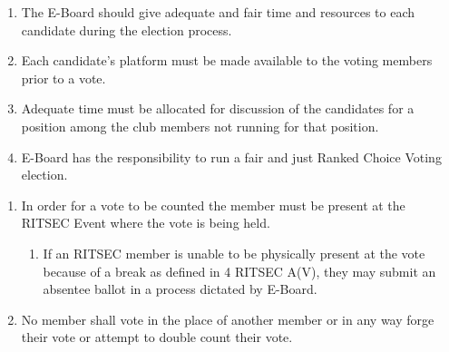 


\begin{enumerate}
  \item The E-Board should give adequate and fair time and resources to each
    candidate during the election process.
  \item Each candidate's platform must be made available to the voting members
    prior to a vote.
  \item Adequate time must be allocated for discussion of the candidates for a
    position among the club members not running for that position.
  \item E-Board has the responsibility to run a fair and just Ranked Choice
    Voting election.
\end{enumerate}


\begin{enumerate}
  \item In order for a vote to be counted the member must be present at the
    RITSEC Event where the vote is being held.
  \begin{enumerate}
    \item If an RITSEC member is unable to be physically present at the vote
      because of a break as defined in 4 RITSEC A(V), they may submit an
      absentee ballot in a process dictated by E-Board.
  \end{enumerate}
  \item No member shall vote in the place of another member or in any way forge
    their vote or attempt to double count their vote.
\end{enumerate}


